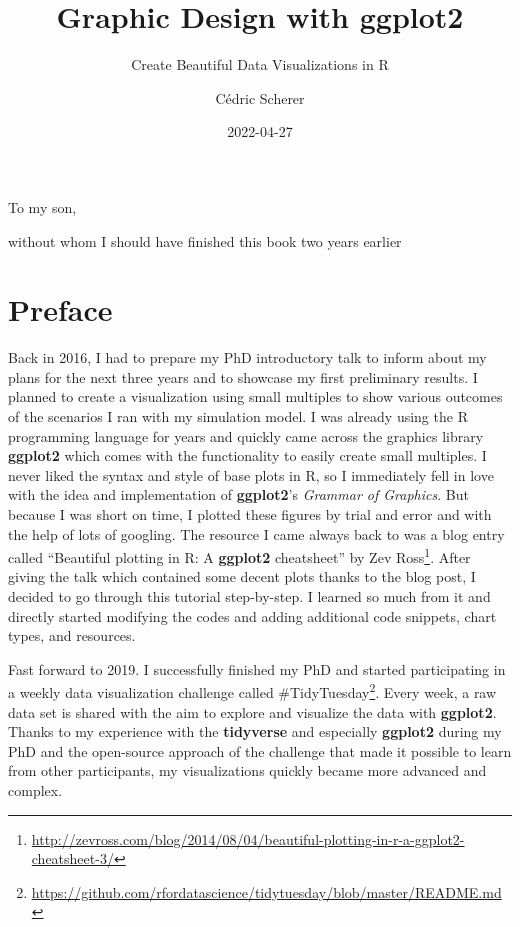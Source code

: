 \documentclass[
]{krantz}
\title{Graphic Design with ggplot2}
\subtitle{Create Beautiful Data Visualizations in R}
\author{Cédric Scherer}
\date{2022-04-27}
\renewcommand{\href}[2]{#2\footnote{\url{#1}}}
\begin{document}
\maketitle


\thispagestyle{empty}

\begin{center}
To my son,

without whom I should have finished this book two years earlier
\end{center}

\setlength{\abovedisplayskip}{-5pt}
\setlength{\abovedisplayshortskip}{-5pt}

{
\hypersetup{linkcolor=}
\setcounter{tocdepth}{2}
\tableofcontents
}
\listoffigures
\listoftables
\hypertarget{preface}{%
\chapter*{Preface}\label{preface}}


Back in 2016, I had to prepare my PhD introductory talk to inform about my plans for the next three years and to showcase my first preliminary results. I planned to create a visualization using small multiples to show various outcomes of the scenarios I ran with my simulation model. I was already using the R programming language for years and quickly came across the graphics library \textbf{ggplot2} which comes with the functionality to easily create small multiples. I never liked the syntax and style of base plots in R, so I immediately fell in love with the idea and implementation of \textbf{ggplot2}'s \emph{Grammar of Graphics}. But because I was short on time, I plotted these figures by trial and error and with the help of lots of googling. The resource I came always back to was a blog entry called \href{http://zevross.com/blog/2014/08/04/beautiful-plotting-in-r-a-ggplot2-cheatsheet-3/}{``Beautiful plotting in R: A \textbf{ggplot2} cheatsheet'' by Zev Ross}. After giving the talk which contained some decent plots thanks to the blog post, I decided to go through this tutorial step-by-step. I learned so much from it and directly started modifying the codes and adding additional code snippets, chart types, and resources.

Fast forward to 2019. I successfully finished my PhD and started participating in a weekly data visualization challenge called \href{https://github.com/rfordatascience/tidytuesday/blob/master/README.md}{\#TidyTuesday}. Every week, a raw data set is shared with the aim to explore and visualize the data with \textbf{ggplot2}. Thanks to my experience with the \textbf{tidyverse} and especially \textbf{ggplot2} during my PhD and the open-source approach of the challenge that made it possible to learn from other participants, my visualizations quickly became more advanced and complex.
\end{document}
